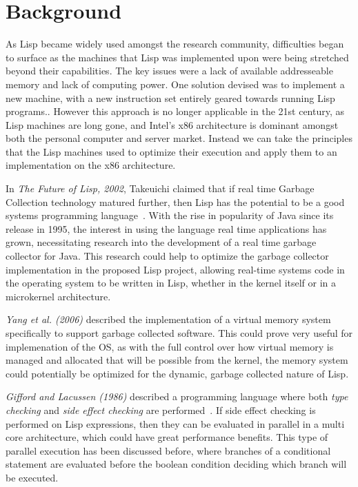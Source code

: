 \documentclass{article}
\begin{document}
  \section{Background}
  As Lisp became widely used amongst the research community, difficulties began to surface as the machines that Lisp was implemented upon were being stretched beyond their capabilities. The key issues were a lack of available addresseable memory and lack of computing power.\cite{WhiteJon1987Amfa}\cite{knight-lisp} One solution devised was to implement a new machine, with a new instruction set entirely geared towards running Lisp programs.\cite{knight-lisp}. However this approach is no longer applicable in the 21st century, as Lisp machines are long gone, and Intel's x86 architecture is dominant amongst both the personal computer and server market. Instead we can take the principles that the Lisp machines used to optimize their execution and apply them to an implementation on the x86 architecture.
  \par
  
  In \textit{The Future of Lisp, 2002}, Takeuichi claimed that if real time Garbage Collection technology matured further, then Lisp has the potential to be a good systems programming language~\cite{TakeuchiIkuo2002TfoL}. With the rise in popularity of Java since its release in 1995, the interest in using the language real time applications has grown, necessitating research into the development of a real time garbage collector for Java\cite{SiebertF.2010Cprg}\cite{SchoeberlMartin2010Nrgc}\cite{KaliberaTomas2011Srgc}. This research could help to optimize the garbage collector implementation in the proposed Lisp project, allowing real-time systems code in the operating system to be written in Lisp, whether in the kernel itself or in a microkernel architecture.
  \par
  
  \textit{Yang et al. (2006)} described the implementation of a virtual memory system specifically to support garbage collected software\cite{Yang:2006:CVM:1298455.1298466}. This could prove very useful for implemenation of the OS, as with the full control over how virtual memory is managed and allocated that will be possible from the kernel, the memory system could potentially be optimized for the dynamic, garbage collected nature of Lisp.
  \par
  
  \textit{Gifford and Lacussen (1986)} described a programming language where both \textit{type checking} and \textit{side effect checking} are performed~\cite{Gifford:1986:IFI:319838.319848}. If side effect checking is performed on Lisp expressions, then they can be evaluated in parallel in a multi core architecture, which could have great performance benefits. This type of parallel execution has been discussed before\cite{YeeJ.J1993Spmi}, where branches of a conditional statement are evaluated before the boolean condition deciding which branch will be executed.
  \par
  
\end{document}
